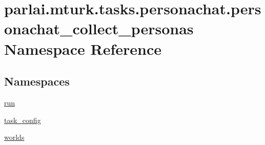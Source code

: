 \hypertarget{namespaceparlai_1_1mturk_1_1tasks_1_1personachat_1_1personachat__collect__personas}{}\section{parlai.\+mturk.\+tasks.\+personachat.\+personachat\+\_\+collect\+\_\+personas Namespace Reference}
\label{namespaceparlai_1_1mturk_1_1tasks_1_1personachat_1_1personachat__collect__personas}
\subsection*{Namespaces}
\begin{DoxyCompactItemize}
\item 
 \hyperlink{namespaceparlai_1_1mturk_1_1tasks_1_1personachat_1_1personachat__collect__personas_1_1run}{run}
\item 
 \hyperlink{namespaceparlai_1_1mturk_1_1tasks_1_1personachat_1_1personachat__collect__personas_1_1task__config}{task\+\_\+config}
\item 
 \hyperlink{namespaceparlai_1_1mturk_1_1tasks_1_1personachat_1_1personachat__collect__personas_1_1worlds}{worlds}
\end{DoxyCompactItemize}
